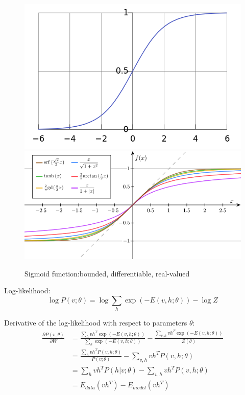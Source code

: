 \documentclass{beamer}
\begin{document}
\begin{CJK*}{UTF8}{gbsn}
\begin{frame}[allowframebreaks]
\begin{figure}
  \includegraphics[scale=0.18]{images/sigmoidfun}
  \includegraphics[scale=0.2]{images/sigmoidfun2}\\
  \caption{Sigmoid function:bounded, differentiable, real-valued}
\end{figure}

Log-likelihood:
\begin{equation}
\log P(v;\theta)=\log\sum_h\exp(-E(v,h;\theta))-\log Z
\end{equation}

Derivative of the log-likelihood with respect to parameters $\theta$:
\begin{equation}
\begin{split}
\frac{\partial P(v;\theta)}{\partial W}&=\frac{\sum_hvh^T\exp(-E(v,h;\theta))}{\sum_h\exp(-E(v,h;\theta))}-\frac{\sum_{v,h}vh^T\exp(-E(v,h;\theta))}{Z(\theta)}\\
&=\frac{\sum_hvh^TP(v,h;\theta)}{P(v;\theta)}-\sum_{v,h}vh^TP(v,h;\theta)\\
&=\sum_hvh^TP(h|v;\theta)-\sum_{v,h}vh^TP(v,h;\theta)\\
&=E_{data}(vh^T)-E_{model}(vh^T)
\end{split}
\end{equation}


\end{frame}
\end{CJK*}
\end{document}
